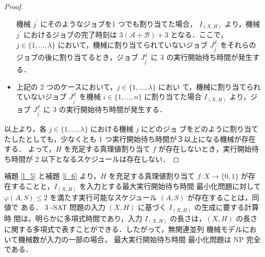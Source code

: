 \documentclass[12pt]{optlab-bachelor}
\begin{document}
\begin{proof}
\begin{itemize}
    機械 $j^{\prime}$ にそのようなジョブを1 つでも割り当てた場合，
    $I_{(X,H)}$ より，機械 $j^{\prime}$ におけるジョブの完了時刻は
    $3(\mathcal{A} + \mathcal{B}) + 3$ となる．ここで，$j \in
    \{1,\ldots,\lambda\}$ において，機械に割り当てられていないジョブ
    $J^d_{j^{\prime}}$ をそれらのジョブの後に割り当てるとき，ジョブ
    $J^d_{j^{\prime}}$ に 3 の実行開始待ち時間が発生する．
    \item 上記の 2 つのケースにおいて，$j \in \{1,\ldots,\lambda\}$ におい
    て，機械に割り当てられていないジョブ $J^d_{j^{\prime}}$ を機械 $i
    \in \{1,\ldots,n\}$ に割り当てた場合 $I_{(X,H)}$ より，ジョブ
    $J^d_{j^{\prime}}$ に 3 の実行開始待ち時間が発生する．
  \end{itemize}
  以上より，各 $j \in \{1,\ldots,\lambda\}$ における機械 $j$ にどのジョ
  ブをどのように割り当てたしたとしても，少なくとも 1 つ実行開始待ち時間が３以上になる機械が存在する．
  よって，$H$ を充足する真理値割り当て $f$ が存在しないとき，実行開始待
  ち時間が 2 以下となるスケジュールは存在しない．
\end{proof}

補題 \ref{l_5} と補題 \ref{l_6} より，$H$ を充足する真理値割り当て $f : X \to \{0,
1\}$ が存在することと，$I_{(X,H)}$ を入力とする最大実行開始待ち時間
最小化問題に対して $\varphi(A, S) \le 2$
を満たす実行可能なスケジュール $(A, S)$ が存在することは，同値で
ある．
3 -SAT 問題の入力 $(X,H)$ に基づく $I_{(X,H)}$ の生成に要する計算時
間は，明らかに多項式時間であり，入力 $I_{(X,H)}$ の長さは，$(X, H)$
の長さに関する多項式で表すことができる．したがって，無関連並列
機械モデルにおいて機械数が入力の一部の場合， 最大実行開始待ち時間
最小化問題は NP 完全である．
\end{document}
